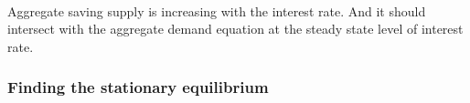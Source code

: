\documentclass[11pt]{article}
\begin{document}
    \begin{center}
    \end{center}
    { \hspace*{\fill} \\}
    
    Aggregate saving supply is increasing with the interest rate. And it
should intersect with the aggregate demand equation at the steady state
level of interest rate.

    \hypertarget{finding-the-stationary-equilibrium}{%
\subsubsection{Finding the stationary
equilibrium}\label{finding-the-stationary-equilibrium}}
\end{document}
